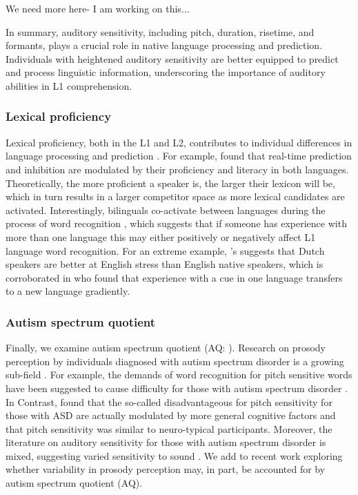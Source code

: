 We need more here- I am working on this...

In summary, auditory sensitivity, including pitch, duration, risetime, and formants, plays a crucial role in native language processing and prediction. Individuals with heightened auditory sensitivity are better equipped to predict and process linguistic information, underscoring the importance of auditory abilities in L1 comprehension.

\subsubsection{Lexical proficiency}
Lexical proficiency, both in the L1 and L2, contributes to individual differences in language processing and prediction \citep{Diependaele2013,Yap2012}. For example, \citep{Kukona2016} found that real-time prediction and inhibition are modulated by their proficiency and literacy in both languages. Theoretically, the more proficient a speaker is, the larger their lexicon will be, which in turn results in a larger competitor space as more lexical candidates are activated. Interestingly, bilinguals co-activate between languages during the process of word recognition \citep{kroll1997lexical,dijkstra2002architecture,marian2003competing}, which suggests that if someone has experience with more than one language this may either positively or negatively affect L1 language word recognition. For an extreme example, \cite{cutler2007dutch}'s suggests that Dutch speakers are better at English stress than English native speakers, which is corroborated in \cite{Pajak_2014} who found that experience with a cue in one language transfers to a new language gradiently. 

\subsubsection{Autism spectrum quotient}
Finally, we examine autism spectrum quotient (AQ: \cite{Baron-Cohen2001}). Research on prosody perception by individuals diagnosed with autism spectrum disorder is a growing sub-field  \citep[see ][]{Grice2023,Paul2005,McCann2003}. For example, the demands of word recognition for pitch sensitive words have been suggested to cause difficulty for those with autism spectrum disorder \citep{schelinski2020speech}. In Contrast, \cite{grossman2023relationship} found that the so-called disadvantageous for pitch sensitivity for those with ASD are actually modulated by more general cognitive factors and that pitch sensitivity was similar to neuro-typical participants. Moreover, the literature on auditory sensitivity for those with autism spectrum disorder is mixed, suggesting varied sensitivity to sound \citep{Kuiper2019,Stiegler2010}. We add to recent work \cite{Sinagra2022} exploring whether variability in prosody perception may, in part, be accounted for by autism spectrum quotient (AQ). 

